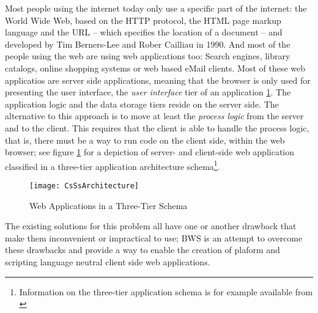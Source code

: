 Most people using the internet today only use a specific part of the internet: the World Wide Web, based on the HTTP protocol, the HTML page markup language and the URL -- which specifies the location of a document -- and developed by Tim Berners-Lee and Rober Cailliau in 1990.\cite{WikWww}
And most of the people using the web are using web applications too: Search engines, library catalogs, online shopping systems or web based eMail clients. Most of these web applicatios are server side applications, meaning that the browser is only used for presenting the user interface, the \emph{user interface} tier of an application \ref{fig:appLayers}. The application logic and the data storage tiers reside on the server side. The alternative to this approach is to move at least the \emph{process logic} from the server and to the client. This requires that the client is able to handle the process logic, that is, there must be a way to run code on the client side, within the web browser; see figure \ref{fig:appLayers} for a depiction of server- and client-side web application classified in a three-tier application architecture schema\footnote{Information on the three-tier application schema is for example available from \cite{FOLtt}}. 
\begin{figure}[htb]
	\centering
		\texttt{[image: CsSsArchitecture]}
	\caption{Web Applications in a Three-Tier Schema}
	\label{fig:appLayers}
\end{figure}

The existing solutions for this problem all have one or another drawback that make them inconvenient or impractical to use; BWS is an attempt to overcome these drawbacks and provide a way to enable the creation of plaform and scripting language neutral client side web applications.